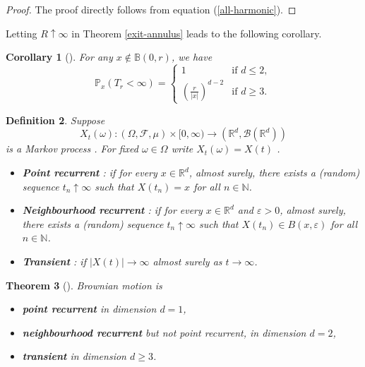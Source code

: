 \documentclass{article}
\numberwithin{equation}{section}
\newtheorem{theorem}{Theorem}[section]
\newtheorem{corollary}[theorem]{Corollary}
\newtheorem{definition}[theorem]{Definition}
\begin{document}
\begin{proof}
The proof directly follows from equation (\ref{all-harmonic}).
\end{proof}
\noindent Letting \( R \uparrow \infty \) in Theorem \ref{exit-annulus} leads to the following corollary.

\begin{corollary}[{\cite[Corollary 3.19]{PeresMortersBook}}]
For any \( x \notin \mathbb{B}(0, r) \), we have
\[
\mathbb{P}_x(T_r < \infty) =
\begin{cases}
1 & \text{if } d \leq 2, \\[10pt]
\displaystyle \left( \frac{r}{|x|} \right)^{d - 2} & \text{if } d \geq 3.
\end{cases}
\]
\end{corollary}
\begin{definition}
Suppose 
\[
X_t(\omega) : (\Omega, \mathscr{F}, \mathbb{\mu}) \times [0, \infty) \to (\mathbb{R}^d, \mathscr{B}(\mathbb{R}^d))
\] is a Markov process . For fixed \(\omega \in \Omega\) write \(X_t(\omega) = X(t)\) .
\begin{itemize}
    \item \textbf{Point recurrent} : if for every \( x \in \mathbb{R}^d \), almost surely, there exists a (random) sequence \( t_n \uparrow \infty \) such that \( X(t_n) = x \) for all \( n \in \mathbb{N} \).
    
    \item \textbf{Neighbourhood recurrent} : if for every \( x \in \mathbb{R}^d \) and \( \varepsilon > 0 \), almost surely, there exists a (random) sequence \( t_n \uparrow \infty \) such that \( X(t_n) \in B(x, \varepsilon) \) for all \( n \in \mathbb{N} \).
    
    \item \textbf{Transient} : if \( |X(t)| \to \infty \) almost surely as \( t \to \infty \).
\end{itemize}
\end{definition}
\begin{theorem}[{\cite[Theorem 3.20]{PeresMortersBook}}]
Brownian motion is
\begin{itemize}
    \item \textbf{point recurrent} in dimension \( d = 1 \),
    \item \textbf{neighbourhood recurrent} but not point recurrent, in dimension \( d = 2 \),
    \item \textbf{transient} in dimension \( d \geq 3 \).
\end{itemize}
\end{theorem}
\end{document}
